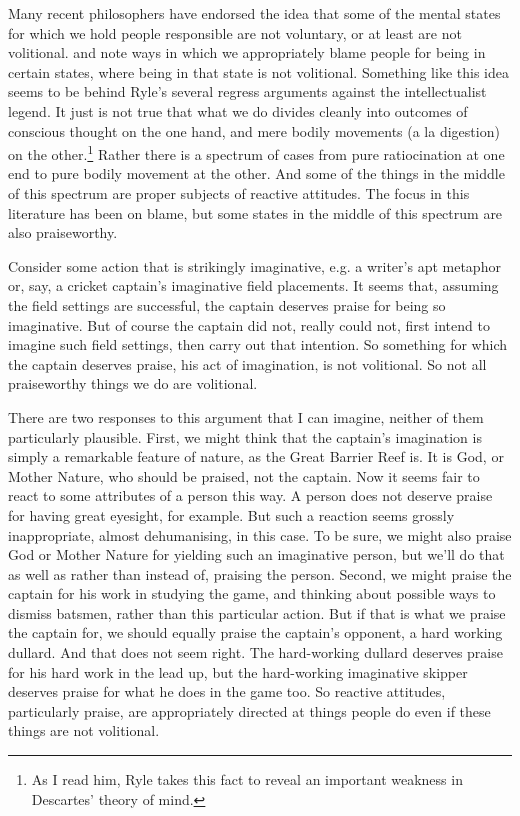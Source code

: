 Many recent philosophers have endorsed the idea that some of the mental states for which we hold people responsible are not voluntary, or at least are not volitional. \citet{Adams1985, Heller2000, Owens2000} and \citet{Hieronymi2008}  note ways in which we appropriately blame people for being in certain states, where being in that state is not volitional. Something like this idea seems to be behind Ryle's several regress arguments against the intellectualist legend. It just is not true that what we do divides cleanly into outcomes of conscious thought on the one hand, and mere bodily movements (a la digestion) on the other.\footnote{As I read him, Ryle takes this fact to reveal an important weakness in Descartes' theory of mind.} Rather there is a spectrum of cases from pure ratiocination at one end to pure bodily movement at the other. And some of the things in the middle of this spectrum are proper subjects of reactive attitudes. The focus in this literature has been on blame, but some states in the middle of this spectrum are also praiseworthy.

Consider some action that is strikingly imaginative, e.g. a writer's apt metaphor or, say, a cricket captain's imaginative field placements. It seems that, assuming the field settings are successful, the captain deserves praise for being so imaginative. But of course the captain did not, really could not, first intend to imagine such field settings, then carry out that intention. So something for which the captain deserves praise, his act of imagination, is not volitional. So not all praiseworthy things we do are volitional.

There are two responses to this argument that I can imagine, neither of them particularly plausible. First, we might think that the captain's imagination is simply a remarkable feature of nature, as the Great Barrier Reef is. It is God, or Mother Nature, who should be praised, not the captain. Now it seems fair to react to some attributes of a person this way. A person does not deserve praise for having great eyesight, for example. But such a reaction seems grossly inappropriate, almost dehumanising, in this case. To be sure, we might also praise God or Mother Nature for yielding such an imaginative person, but we'll do that as well as rather than instead of, praising the person. Second, we might praise the captain for his work in studying the game, and thinking about possible ways to dismiss batsmen, rather than this particular action. But if that is what we praise the captain for, we should equally praise the captain's opponent, a hard working dullard. And that does not seem right. The hard-working dullard deserves praise for his hard work in the lead up, but the hard-working imaginative skipper deserves praise for what he does in the game too. So reactive attitudes, particularly praise, are appropriately directed at things people do even if these things are not volitional. 

